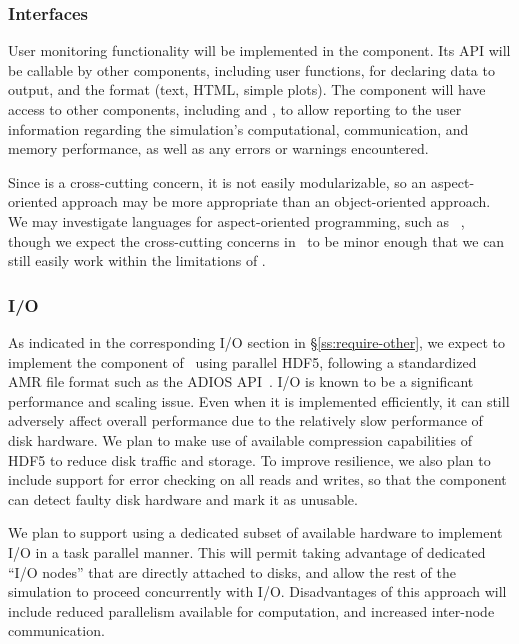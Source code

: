 \documentclass[10pt,twocolumn]{article}
\begin{document}
\subsubsection{Interfaces} \label{sss:design-interfaces}

User monitoring functionality will be implemented in the
 component.  Its API will be callable by other
components, including user functions, for declaring data to output,
and the format (text, HTML, simple plots).  The component will have
access to other components, including  and
, to allow reporting to the user information regarding the
simulation's computational, communication, and memory performance, as
well as any errors or warnings encountered.

Since  is a cross-cutting concern, it is not easily
modularizable, so an aspect-oriented approach may be more appropriate
than an object-oriented approach.  We may investigate languages for
aspect-oriented programming, such as
~\cite{wwwaspectcpp}, though we expect the cross-cutting
concerns in \cello\ to be minor enough that we can still easily work
within the limitations of \cpp.

\subsubsection{I/O} \label{sss:design-io}

As indicated in the corresponding I/O section in
\S\ref{ss:require-other}, we expect to implement the 
component of \cello\ using parallel HDF5, following a standardized AMR
file format such as the ADIOS API~\cite{LoKl08}.  I/O is known to be a
significant performance and scaling issue.  Even when it is
implemented efficiently, it can still adversely affect overall
performance due to the relatively slow performance of disk hardware.
We plan to make use of available compression capabilities of HDF5 to
reduce disk traffic and storage.  To improve resilience, we also plan
to include support for error checking on all reads and writes, so that
the  component can detect faulty disk hardware and mark it
as unusable.

We plan to support using a dedicated subset of available hardware to
implement I/O in a task parallel manner.  This will permit taking
advantage of dedicated ``I/O nodes'' that are directly attached to
disks, and allow the rest of the simulation to proceed concurrently
with I/O.  Disadvantages of this approach will include reduced
parallelism available for computation, and increased inter-node
communication.
\end{document}
